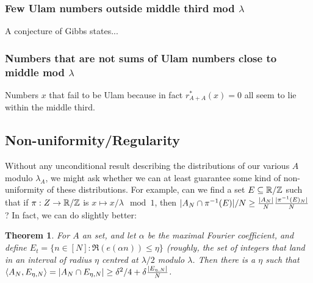 \documentclass{article}
\newtheorem{theorem}{Theorem}[section]
\theoremstyle{definition}
\newtheorem{definition}{Definition}
\theoremstyle{remark}
\numberwithin{equation}{section}
\begin{document}

{\color{red}

\subsubsection{Few Ulam numbers outside middle third mod $\lambda$}

A conjecture of Gibbs states...

\subsubsection{Numbers that are not sums of Ulam numbers close to middle mod $\lambda$}

Numbers $x$ that fail to be Ulam because in fact $r^*_{A+A}(x) = 0$
all seem to lie within the middle third.  

}

\subsection{Non-uniformity/Regularity}


Without any unconditional result describing the distributions of our
various $A$ modulo $\lambda_A$, we might ask whether we can at least
guarantee some kind of non-uniformity of these distributions.  For
example, can we find a set $E \subseteq \mathbb{R}/\mathbb{Z}$ such that if
$\pi : Z \to \mathbb{R}/\mathbb{Z}$ is $x \mapsto x/\lambda \mod{1}$, then
$|A_N \cap \pi^{-1}(E)|/N \geq
\frac{|A_N|}{N}\frac{|\pi^{-1}(E)_N|}{N}$?  In fact, we can do slightly
better:

\begin{theorem}\label{thm:regularity}
  For $A$ an \relevant set, and let $\alpha$ be the maximal Fourier
  coefficient, and define
  $E_{t} = \{n \in [N] : \Re(e(\alpha n)) \leq \eta\}$ (roughly, the
  set of integers that land in an interval of radius $\eta$ centred at
  $\lambda/2$ modulo $\lambda$.  Then there is a $\eta$ such that
  $\left<A_N, E_{\eta,N}\right> = |A_N \cap E_{\eta,N}| \geq \delta^2/4 +
  \delta \frac{|E_{\eta,N}|}{N}$.
\end{theorem}
\end{document}
